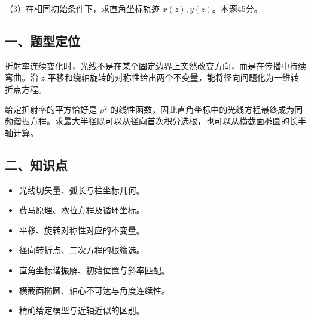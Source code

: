 \documentclass[12pt,a4paper,fontset=fandol]{ctexart}
\providecommand{\tightlist}{\setlength{\itemsep}{0pt}\setlength{\parskip}{0pt}}
\begin{document}
（3）在相同初始条件下，求直角坐标轨迹 \(x(z),y(z)\)。本题45分。

\begin{center}
\begin{minipage}{\linewidth}
\centering\begingroup
{}
\ifdim\wd\diagrambox>.88\linewidth
\sbox{\diagrambox}{\resizebox{.88\linewidth}{!}{\usebox{\diagrambox}}}
\fi
\ifdim\ht\diagrambox>.40\textheight
\resizebox{!}{.40\textheight}{\usebox{\diagrambox}}
\else\usebox{\diagrambox}\fi
\par{}
\endgroup\end{minipage}
\end{center}

\subsection{一、题型定位}\label{ux4e00ux9898ux578bux5b9aux4f4d-6}

折射率连续变化时，光线不是在某个固定边界上突然改变方向，而是在传播中持续弯曲。沿
\(z\)
平移和绕轴旋转的对称性给出两个不变量，能将径向问题化为一维转折点方程。

给定折射率的平方恰好是 \(\rho^2\)
的线性函数，因此直角坐标中的光线方程最终成为同频谐振方程。求最大半径既可以从径向首次积分选根，也可以从横截面椭圆的长半轴计算。

\subsection{二、知识点}\label{ux4e8cux77e5ux8bc6ux70b9-6}

\begin{itemize}
\tightlist
\item
  光线切矢量、弧长与柱坐标几何。
\item
  费马原理、欧拉方程及循环坐标。
\item
  平移、旋转对称性对应的不变量。
\item
  径向转折点、二次方程的根筛选。
\item
  直角坐标谐振解、初始位置与斜率匹配。
\item
  横截面椭圆、轴心不可达与角度连续性。
\item
  精确给定模型与近轴近似的区别。
\end{itemize}
\end{document}
